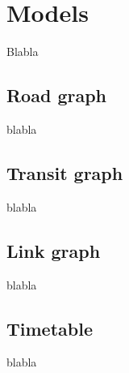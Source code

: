 \section{Models}\label{models}
	Blabla

\subsection{Road graph}
	blabla

\subsection{Transit graph}
	blabla

\subsection{Link graph}
	blabla

\subsection{Timetable}
	blabla